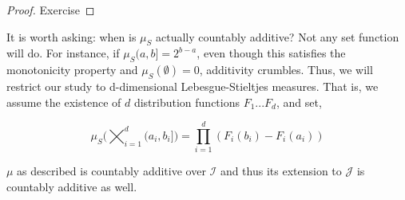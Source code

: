 \begin{proof}
   Exercise
\end{proof}

It is worth asking: when is $\mu_S$ actually countably additive? Not any set function will do.
For instance, if $\mu_S(a,b] = 2^{b-a}$, even though this satisfies the monotonicity property and 
$\mu_S(\emptyset) = 0$, additivity crumbles. Thus, we will restrict our study to d-dimensional 
Lebesgue-Stieltjes measures. That is, we assume the existence of 
$d$ distribution functions $F_1... F_d$, and set, 

\[ \mu_S\bigg( \bigtimes_{i=1}^d (a_i,b_i] \bigg)  = \prod_{i=1}^d (F_i(b_i) - F_i(a_i))\]

\begin{theorem}
   $\mu$ as described is countably additive over $\mathcal I$ and thus its extension to 
   $\mathcal J$ is countably additive as well.
\end{theorem}

